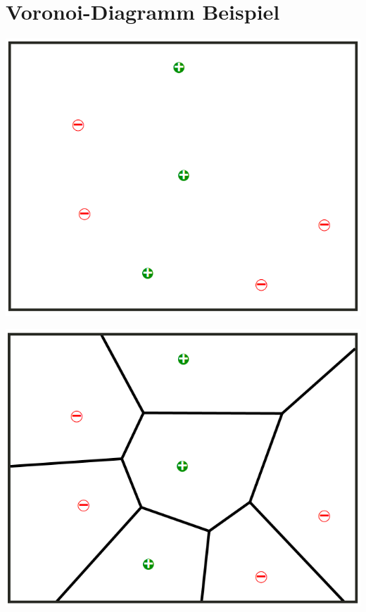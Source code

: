\documentclass[fontsize=11pt]{scrartcl}
\newenvironment{Figure}
  {\par\medskip\noindent\minipage{\linewidth}}
  {\endminipage\par\medskip}
\begin{document}
        \section{Voronoi-Diagramm Beispiel}
            \begin{Figure}
                \begin{minipage}[b]{.4\linewidth}
                    \includegraphics[scale=0.3]{vor1.png}
                \end{minipage}
                \hspace{.1\linewidth}
                \begin{minipage}[b]{.4\linewidth}
                    \includegraphics[scale=0.3]{vor2.png}
                \end{minipage}
            \end{Figure}
\end{document}
